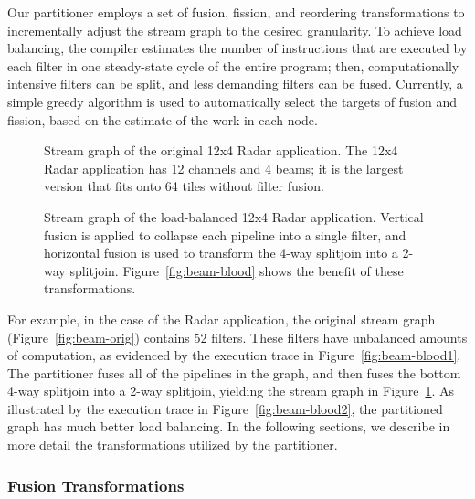 Our partitioner employs a set of fusion, fission, and reordering
transformations to incrementally adjust the stream graph to the
desired granularity.  To achieve load balancing, the compiler
estimates the number of instructions that are executed by each filter
in one steady-state cycle of the entire program; then, computationally
intensive filters can be split, and less demanding filters can be
fused.  Currently, a simple greedy algorithm is used to automatically
select the targets of fusion and fission, based on the estimate of the
work in each node.

\begin{figure}[!h]
\centering
\begin{minipage}{3.0in}
\centering
{}
\caption{\protect\small Stream graph of the original 12x4 Radar
application.  The 12x4 Radar application has 12 channels and 4 beams;
it is the largest version that fits onto 64 tiles without filter
fusion.  \protect\label{fig:beam-orig}}
\end{minipage}
\hspace{0.1in}
\begin{minipage}{3.0in}
\centering
{}
\caption{\protect\small Stream graph of the load-balanced 12x4
Radar application.  Vertical fusion is applied to collapse each pipeline
into a single filter, and horizontal fusion is used to transform the
4-way splitjoin into a 2-way splitjoin.  Figure~\ref{fig:beam-blood}
shows the benefit of these
transformations. \protect\label{fig:beam-opt}}
\end{minipage}
\end{figure}


For example, in the case of the Radar application, the original
stream graph (Figure~\ref{fig:beam-orig}) contains 52 filters.  These
filters have unbalanced amounts of computation, as evidenced by the
execution trace in Figure~\ref{fig:beam-blood1}.  The partitioner
fuses all of the pipelines in the graph, and then fuses the bottom
4-way splitjoin into a 2-way splitjoin, yielding the stream graph in
Figure~\ref{fig:beam-opt}.  As illustrated by the execution trace in
Figure~\ref{fig:beam-blood2}, the partitioned graph has much better
load balancing.  In the following sections, we describe in more detail
the transformations utilized by the partitioner.


\subsubsection{Fusion Transformations}


